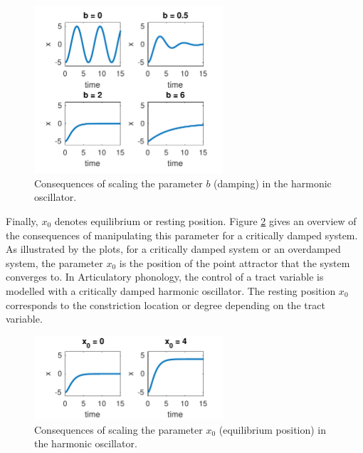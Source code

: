 \begin{figure}[htp]
\begin{center}
\includegraphics[width=7cm]{figures/ch3/dho_damping.pdf}
\caption{Consequences of scaling the parameter $b$ (damping) in the harmonic oscillator.}
\label{fig:dho_damp}
\end{center}
\end{figure}

Finally, $x_0$ denotes equilibrium or resting position. Figure \ref{fig:dho_rest} gives an overview of the consequences of manipulating this parameter for a critically damped system. As illustrated by the plots, for a critically damped system or an overdamped system, the parameter $x_0$ is the position of the point attractor that the system converges to. In Articulatory phonology, the control of a tract variable is modelled with a critically damped harmonic oscillator. The resting position $x_0$ corresponds to the constriction location or degree depending on the tract variable. 

\begin{figure}[htp]
\begin{center}
\includegraphics[width=7cm]{figures/ch3/dho_x0.pdf}
\caption{Consequences of scaling the parameter $x_0$ (equilibrium position) in the harmonic oscillator.}
\label{fig:dho_rest}
\end{center}
\end{figure}

